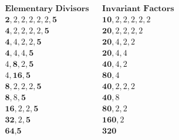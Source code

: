 \begin{align*}
 &\textbf{Elementary Divisors} && \textbf{Invariant Factors} \\
 &\textbf{2}, 2, 2, 2, 2, 2, \textbf{5} && \textbf{10}, 2, 2, 2, 2, 2 \\
 &\textbf{4}, 2, 2, 2, 2, \textbf{5} && \textbf{20}, 2, 2, 2, 2 \\
 &\textbf{4}, 4, 2, 2, \textbf{5} && \textbf{20}, 4, 2, 2 \\
 &\textbf{4}, 4, 4, \textbf{5} && \textbf{20}, 4, 4 \\
 &4, \textbf{8}, 2, \textbf{5} && \textbf{40}, 4, 2 \\
 &4, \textbf{16}, \textbf{5} && \textbf{80}, 4 \\
 &\textbf{8}, 2, 2, 2, \textbf{5} && \textbf{40}, 2, 2, 2 \\
 &\textbf{8}, 8, \textbf{5} && \textbf{40}, 8 \\
 &\textbf{16}, 2, 2, \textbf{5} && \textbf{80}, 2, 2 \\
 &\textbf{32}, 2, \textbf{5} && \textbf{160}, 2 \\
 &\textbf{64}, \textbf{5} && \textbf{320}
\end{align*}
